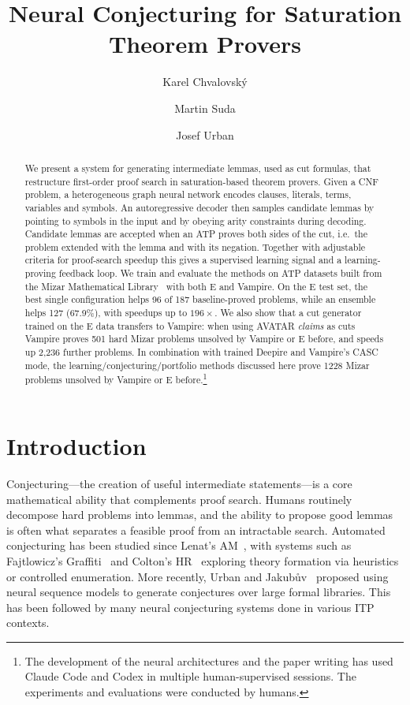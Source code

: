 \documentclass{easychair}
\title{Neural Conjecturing for Saturation Theorem Provers}
\author{
Karel Chvalovsk{\'y}\inst{1}
\and
Martin Suda\inst{1}
\and
Josef Urban\inst{2,3}
}
\institute{
Czech Technical University in Prague
\and
AI4REASON
\and University of Gothenburg / Chalmers University
}
\newcommand{\Eprover}{E\xspace}
\newcommand{\Vampire}{Vampire\xspace}
\newcommand{\Mizar}{Mizar\xspace}
\begin{document}
\maketitle

\begin{abstract}
We present a system for generating intermediate lemmas, used as cut
formulas, that restructure first-order proof search in saturation-based
theorem provers.  Given a CNF problem, a heterogeneous graph neural
network encodes clauses, literals, terms, variables and symbols. An
autoregressive decoder then samples candidate lemmas by pointing to
symbols in the input and by obeying arity constraints during decoding.
Candidate lemmas are accepted when an ATP
proves both sides of the cut, i.e.\ the problem extended with the
lemma and with its negation.  Together with adjustable criteria for proof-search speedup this gives a
supervised learning signal and a learning-proving feedback loop.  We train and evaluate the methods on ATP datasets built from the \Mizar Mathematical
Library~\cite{Grabowski2010} with both \Eprover and
\Vampire .
On the \Eprover test set,
the best single configuration helps 96 of 187 baseline-proved
problems, while an ensemble helps 127 (67.9\%), with speedups up to
$196\times$.  We also show that a cut generator trained on the \Eprover data transfers
to \Vampire: when using AVATAR \emph{claims} as cuts \Vampire proves
501 hard \Mizar problems unsolved by Vampire or E before, and speeds up 2,236 further
problems. In combination with trained Deepire and Vampire's CASC mode, the learning/conjecturing/portfolio methods discussed here prove 1228 \Mizar problems unsolved by Vampire or E before.\footnote{The development of the neural architectures and the paper writing has used Claude Code and Codex in multiple human-supervised sessions. The experiments and evaluations were conducted by humans.}
\end{abstract}

\section{Introduction}

Conjecturing---the creation of useful intermediate statements---is a
core mathematical ability that complements proof search.  Humans
routinely decompose hard problems into lemmas, and the ability to
propose good lemmas is often what separates a feasible proof from an
intractable search.  Automated conjecturing has been studied since
Lenat's AM~\cite{Lenat1977}, with systems such as Fajtlowicz's
Graffiti~\cite{Fajtlowicz1988} and Colton's HR~\cite{Colton2002}
exploring theory formation via heuristics or controlled enumeration.
More recently, Urban and Jakub\r{u}v~\cite{Urban2020} proposed using
neural sequence models to generate conjectures over large formal
libraries. This has been followed by many neural conjecturing systems done in various ITP contexts.
\end{document}
